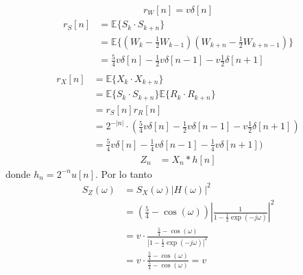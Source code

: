 \begin{solution}
\begin{parts}
\parte
\begin{align*}
r_W[n] = v \delta[n]
\end{align*}
\parte
\begin{align*}
r_S[n] &= \mathbb{E}\{S_k \cdot S_{k+n}\} \\
       &= \mathbb{E}\{(W_k - \frac12 W_{k-1})(W_{k+n} - \frac12 W_{k+n-1})\} \\
       &= \frac{5}{4} v \delta[n] - \frac12 v \delta[n-1] - v \frac12 \delta[n+1] \\
\end{align*}
\parte
\begin{align*}
r_X[n] &= \mathbb{E}\{X_k \cdot X_{k+n}\} \\
       &= \mathbb{E}\{S_k \cdot S_{k+n}\} \mathbb{E}\{R_k \cdot R_{k+n}\} \\
       &= r_S[n] r_R[n] \\
       &= 2^{-|n|} \cdot
          \left(\frac{5}{4} v \delta[n] - \frac12 v \delta[n-1] - v \frac12 \delta[n+1]\right) \\
       &= \frac{5}{4} v \delta[n] - \frac14 v \delta[n-1] - \frac14 v \delta[n+1])
\end{align*}
\parte
\begin{align*}
Z_n &= X_n \ast h[n]
\end{align*}
donde $h_n = 2^{-n} u[n]$. Por lo tanto
\begin{align*}
S_Z(\omega) &= S_X(\omega) |H(\omega)|^2 \\
             &= \left(\frac54 - \cos(\omega)\right) \left|\frac{1}{1-\frac12 \exp(-j\omega)}\right|^2 \\
             &= v \cdot \frac{\frac54 - \cos(\omega)}{ \left|1-\frac12 \exp(-j\omega)\right|^2} \\
             &= v \cdot \frac{\frac54 - \cos(\omega)}{ \frac54 - \cos(\omega)} = v
\end{align*}
\end{parts}
\end{solution}

\else

